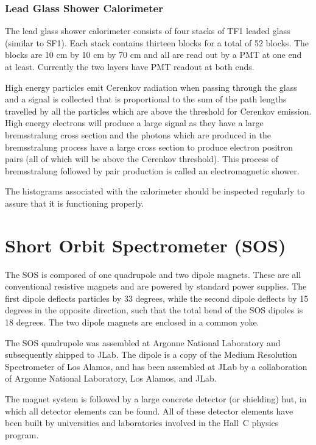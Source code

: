 \subsubsection{Lead Glass Shower Calorimeter}

The lead glass shower calorimeter consists of four stacks of
TF1 leaded glass (similar to SF1). Each stack contains thirteen
blocks for a total of 52 blocks. The blocks are 10 cm by 10 cm by 70
cm and all are read out by a PMT at one end at least.  Currently the
two layers have PMT readout at both ends.

High energy particles
emit Cerenkov radiation when passing through the glass and a signal
is collected that is proportional to the sum of the path lengths
travelled by all the
particles which are above the threshold for Cerenkov emission. High energy
electrons will produce a large signal as they have a large bremsstralung
cross section and the photons which are produced in the bremsstralung
process have a large cross section to produce electron positron pairs
(all of which will be above the Cerenkov threshold). This process
of bremsstralung followed by pair production is called an electromagnetic
shower.

The histograms associated with the calorimeter should be inspected
regularly to assure that it is functioning properly.

\section{Short Orbit Spectrometer (SOS) }

The SOS is composed of one quadrupole and two dipole magnets.
These are all conventional resistive magnets and are powered by standard
power supplies.
The first dipole deflects particles by 33 degrees, while the
second dipole deflects by 15 degrees in the opposite direction, such
that the total bend of the SOS dipoles is 18 degrees.
The two dipole magnets are enclosed in a common yoke.

The SOS quadrupole was assembled at Argonne National Laboratory and
subsequently shipped to JLab. The dipole is a copy of the Medium Resolution
Spectrometer of Los Alamos, and has been assembled at JLab by a collaboration
of Argonne National Laboratory, Los Alamos, and JLab.

The magnet system is followed by a large concrete detector (or shielding) hut,
in which all detector elements can be found. All of these
detector elements have been built by universities and laboratories involved 
in the Hall~C
physics program.

